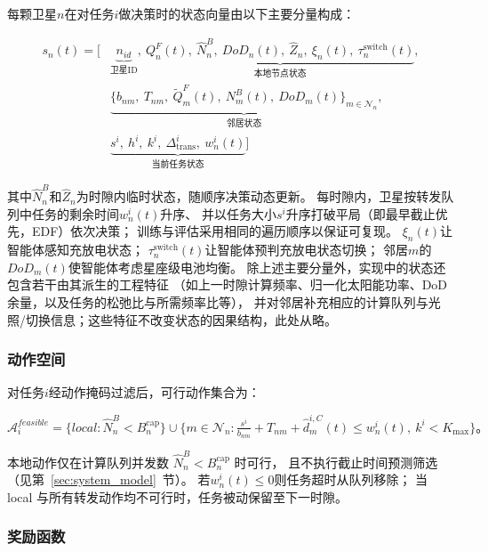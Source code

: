 \documentclass[a4paper,11pt]{article}
\begin{document}
每颗卫星$n$在对任务$i$做决策时的状态向量由以下主要分量构成：

\begin{equation}
\begin{aligned}
s_n(t) = \Big[
&\underbrace{n_{id}}_{\text{卫星ID}},\
\underbrace{Q^F_n(t),\ \hat{N}^B_n,\ DoD_n(t),\
\hat{Z}_n,\ \xi_n(t),\ \tau^{\mathrm{switch}}_n(t)}_{\text{本地节点状态}}, \\
&\underbrace{\{b_{nm},\ T_{nm},\ \tilde{Q}^F_m(t),\
N^B_m(t),\ DoD_m(t)\}_{m \in \mathcal{N}_n}}_{\text{邻居状态}}, \\
&\underbrace{s^i,\ h^i,\ k^i,\ \Delta^i_{\mathrm{trans}},\
w^i_n(t)}_{\text{当前任务状态}}
\Big]
\end{aligned}
\label{eq:state}
\end{equation}

其中$\hat{N}^B_n$和$\hat{Z}_n$为时隙内临时状态，随顺序决策动态更新。
每时隙内，卫星按转发队列中任务的剩余时间$w^i_n(t)$升序、
并以任务大小$s^i$升序打破平局（即最早截止优先，EDF）依次决策；
训练与评估采用相同的遍历顺序以保证可复现。
$\xi_n(t)$让智能体感知充放电状态；
$\tau^{\mathrm{switch}}_n(t)$让智能体预判充放电状态切换；
邻居$m$的$DoD_m(t)$使智能体考虑星座级电池均衡。
除上述主要分量外，实现中的状态还包含若干由其派生的工程特征
（如上一时隙计算频率、归一化太阳能功率、DoD 余量，以及任务的松弛比与所需频率比等），
并对邻居补充相应的计算队列与光照/切换信息；这些特征不改变状态的因果结构，此处从略。

\subsubsection{动作空间}

对任务$i$经动作掩码过滤后，可行动作集合为：

\begin{equation}
\mathcal{A}^{feasible}_i =
\{local : \hat{N}^B_n < B^{\mathrm{cap}}_n\}
\cup \Big\{m \in \mathcal{N}_n : \tfrac{s^i}{b_{nm}}+T_{nm}+\hat{d}^{i,C}_m(t) \le w^i_n(t),\ k^i < K_{\max}\Big\}。
\label{eq:feasible_actions}
\end{equation}

本地动作仅在计算队列并发数 $\hat{N}^B_n < B^{\mathrm{cap}}_n$ 时可行，
且不执行截止时间预测筛选（见第~\ref{sec:system_model}~节）。
若$w^i_n(t) \leq 0$则任务超时从队列移除；
当 local 与所有转发动作均不可行时，任务被动保留至下一时隙。

\subsubsection{奖励函数}
\label{subsec:reward}
\end{document}
